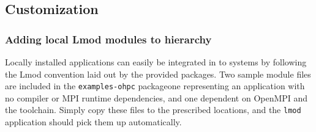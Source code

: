 \clearpage

\subsection{Customization} \label{appendix:customization}

\subsubsection{Adding local Lmod modules to \OHPC{} hierarchy} \label{appendix:modulefiles}
Locally installed applications can easily be integrated in to \OHPC{} systems by
following the Lmod convention laid out by the provided packages. Two sample
module files are included in the \texttt{examples-ohpc} package\textemdash one
representing an application with no compiler or MPI runtime dependencies, and
one dependent on OpenMPI and the \GNU{} toolchain. Simply copy these files to the
prescribed locations, and the \texttt{lmod} application should pick them up
automatically.

